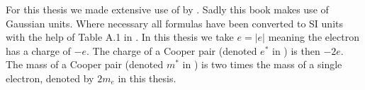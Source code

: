 For this thesis we made extensive use of  by . Sadly this book makes use of Gaussian units. Where necessary all formulas have been converted to SI units with the help of Table A.1 in . In this thesis we take $e = |e|$ meaning the electron has a charge of $-e$. The charge of a Cooper pair (denoted $e^*$ in ) is then $-2e$. The mass of a Cooper pair (denoted $m^*$ in ) is two times the mass of a single electron, denoted by $2m_e$ in this thesis.